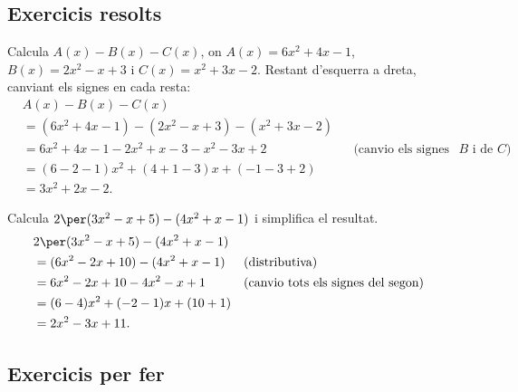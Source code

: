 \subsection{Exercicis resolts}

\begin{exresolt}
Calcula $A(x) - B(x) - C(x)$, on $A(x)=6x^2+4x-1$,
$B(x)=2x^2-x+3$ i $C(x)=x^2+3x-2$.
\solucio
Restant d'esquerra a dreta, canviant els signes en cada resta:
\begin{align*}
&A(x)-B(x)-C(x) \\
&= (6x^2+4x-1)-(2x^2-x+3)-(x^2+3x-2) \\
&= 6x^2+4x-1-2x^2+x-3-x^2-3x+2
   &&\text{(canvio els signes de $B$ i de $C$)} \\
&= (6-2-1)x^2+(4+1-3)x+(-1-3+2) \\
&= 3x^2+2x-2.
\end{align*}
\end{exresolt}

\begin{exresolt}
Calcula $2\per(3x^2-x+5)-(4x^2+x-1)$ i simplifica el resultat.
\solucio
\begin{align*}
&2\per(3x^2-x+5)-(4x^2+x-1) \\
&= (6x^2-2x+10)-(4x^2+x-1)
   &&\text{(distributiva)} \\
&= 6x^2-2x+10-4x^2-x+1
   &&\text{(canvio tots els signes del segon)} \\
&= (6-4)x^2+(-2-1)x+(10+1) \\
&= 2x^2-3x+11.
\end{align*}
\end{exresolt}

\subsection{Exercicis per fer}


